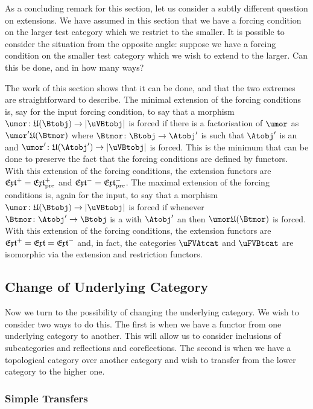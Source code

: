 \documentclass[%
12pt,%
arxiv,%
defaults
]{myclass}
\begin{document}
As a concluding remark for this section, let us consider a subtly different question on extensions.
We have assumed in this section that we have a forcing condition on the larger test category which we restrict to the smaller.
It is possible to consider the situation from the opposite angle: suppose we have a forcing condition on the smaller test category which we wish to extend to the larger.
Can this be done, and in how many ways?

The work of this section shows that it can be done, and that the two extremes are straightforward to describe.
The minimal extension of the forcing conditions is, say for the input forcing condition, to say that a morphism \(\umor \colon \ufunc(\Btobj) \to \forfunc[\uVBtobj]\) is forced if there is a factorisation of \(\umor\) as \(\umor' \ufunc(\Btmor)\) where \(\Btmor \colon \Btobj \to \Atobj'\) is such that \(\Atobj'\) is an \Atobjalt and \(\umor' \colon \ufunc(\Atobj') \to \forfunc[\uVBtobj]\) is forced.
This is the minimum that can be done to preserve the fact that the forcing conditions are defined by functors.
With this extension of the forcing conditions, the extension functors are \(\Jextfunc = \PJextfunc\) and \(\Mextfunc = \PMextfunc\).
The maximal extension of the forcing conditions is, again for the input, to say that a morphism \(\umor \colon \ufunc(\Btobj) \to \forfunc[\uVBtobj]\) is forced if whenever \(\Btmor \colon \Atobj' \to \Btobj\) is a \Btmor with \(\Atobj'\) an \Atobjalt then \(\umor \ufunc(\Btmor)\) is forced.
With this extension of the forcing conditions, the extension functors are \(\Jextfunc = \extfunc = \Mextfunc\) and, in fact, the categories \(\uFVAtcat\) and \(\uFVBtcat\) are isomorphic via the extension and restriction functors.

\subsection{Change of Underlying Category}

Now we turn to the possibility of changing the underlying category.
We wish to consider two ways to do this.
The first is when we have a functor from one underlying category to another.
This will allow us to consider inclusions of subcategories and reflections and coreflections.
The second is when we have a topological category over another category and wish to transfer \uFVtobjs from the lower category to the higher one.

\subsubsection{Simple Transfers}
\end{document}

